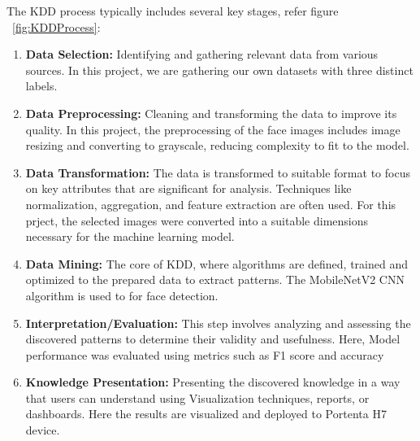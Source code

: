 The KDD process typically includes several key stages, refer figure ~\ref{fig:KDDProcess}:
\begin{enumerate}
	\item \textbf{Data Selection:} Identifying and gathering relevant data from various sources. In this project, we are gathering our own datasets with three distinct labels.
	
	\item \textbf{Data Preprocessing:} Cleaning and transforming the data to improve its quality. In this project, the preprocessing of the face images includes image resizing and converting to grayscale, reducing complexity to fit to the model. 
	
	\item \textbf{Data Transformation:} The data is transformed to suitable format to focus on key attributes that are significant for analysis. Techniques like normalization, aggregation, and feature extraction are often used. For this prject, the selected images were converted into a suitable dimensions necessary for the machine learning model.
	
	\item \textbf{Data Mining:} The core of KDD, where algorithms are defined, trained and optimized to the prepared data to extract patterns. The MobileNetV2 CNN algorithm is used to for face detection.
	
	\item \textbf{Interpretation/Evaluation:} This step involves analyzing and assessing the discovered patterns to determine their validity and usefulness. Here, Model performance was evaluated using metrics such as F1 score and accuracy
	
	\item \textbf{Knowledge Presentation:} Presenting the discovered knowledge in a way that users can understand using Visualization techniques, reports, or dashboards. Here the results are visualized and deployed to Portenta H7 device.

\end{enumerate}
